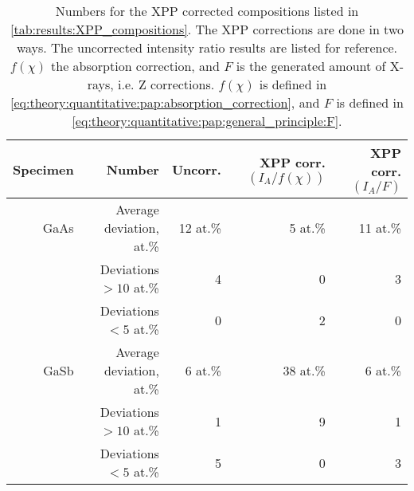 \begin{table}[phtb]
    \begin{center}
        \caption{
            Numbers for the XPP corrected compositions listed in \cref{tab:results:XPP_compositions}.
            The XPP corrections are done in two ways.
            The uncorrected intensity ratio results are listed for reference.
            $f(\chi)$ the absorption correction, and $F$ is the generated amount of X-rays, i.e. Z corrections.
            $f(\chi)$ is defined in \cref{eq:theory:quantitative:pap:absorption_correction}, and $F$ is defined in \cref{eq:theory:quantitative:pap:general_principle:F}.
        }
        \label{tab:results:XPP_compositions_stats}
        \begin{tabular}{rrrrr}
            \hline
            \textbf{Specimen} & \textbf{Number}          & \textbf{Uncorr.} & \textbf{XPP corr. $(I_A/f(\chi))$} & \textbf{XPP corr. $(I_A/F)$} \\
            \hline

            GaAs              & Average deviation, at.\% & 12 at.\%         & 5 at.\%                            & 11 at.\%                     \\
                              & Deviations $>10$ at.\%   & 4                & 0                                  & 3                            \\
                              & Deviations  $<5$  at.\%  & 0                & 2                                  & 0                            \\
            \hline

            GaSb              & Average deviation, at.\% & 6 at.\%          & 38 at.\%                           & 6 at.\%                      \\
                              & Deviations $>10$ at.\%   & 1                & 9                                  & 1                            \\
                              & Deviations  $<5$  at.\%  & 5                & 0                                  & 3                            \\

            \hline
        \end{tabular}
    \end{center}
\end{table}
